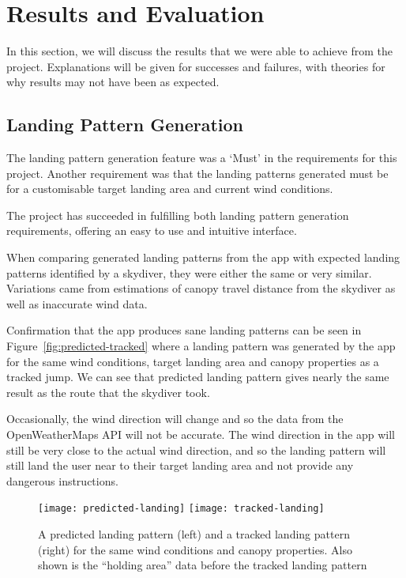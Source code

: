 \section{Results and Evaluation}\label{sec:results-and-evaluation}
In this section, we will discuss the results that we were able to achieve from the project. Explanations will be given for successes and failures, with theories for why results may not have been as expected.


\subsection{Landing Pattern Generation}
The landing pattern generation feature was a `Must' in the requirements for this project. Another requirement was that the landing patterns generated must be for a customisable target landing area and current wind conditions.

The project has succeeded in fulfilling both landing pattern generation requirements, offering an easy to use and intuitive interface.

When comparing generated landing patterns from the app with expected landing patterns identified by a skydiver, they were either the same or very similar. Variations came from estimations of canopy travel distance from the skydiver as well as inaccurate wind data.

Confirmation that the app produces sane landing patterns can be seen in Figure~\vref{fig:predicted-tracked} where a landing pattern was generated by the app for the same wind conditions, target landing area and canopy properties as a tracked jump. We can see that predicted landing pattern gives nearly the same result as the route that the skydiver took.

Occasionally, the wind direction will change and so the data from the OpenWeatherMaps API will not be accurate. The wind direction in the app will still be very close to the actual wind direction, and so the landing pattern will still land the user near to their target landing area and not provide any dangerous instructions.

\begin{figure}[ht]
  \centering
  \texttt{[image: predicted-landing]}
  \hspace{1cm}
  \texttt{[image: tracked-landing]}
  \caption{A predicted landing pattern (left) and a tracked landing pattern (right) for the same wind conditions and canopy properties. Also shown is the ``holding area'' data before the tracked landing pattern}\label{fig:predicted-tracked}
\end{figure}

